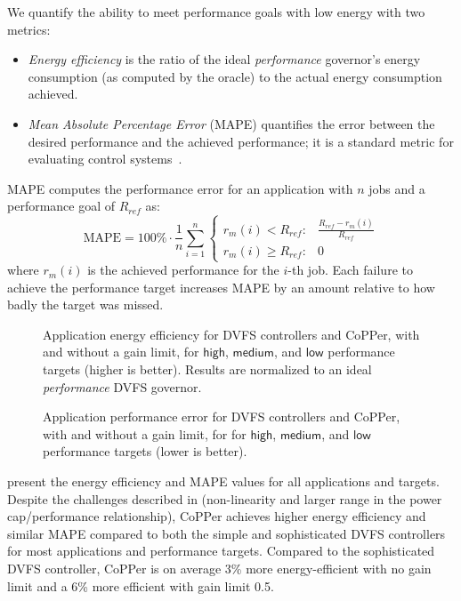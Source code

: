 We quantify the ability to meet performance goals with low energy with two metrics:
\begin{itemize}
\item \emph{Energy efficiency} is the ratio of the ideal \emph{performance} governor's energy consumption (as computed by the oracle) to the actual energy consumption achieved.  
\item \emph{Mean Absolute Percentage Error} (MAPE) quantifies the error between the desired performance and the achieved performance; it is a standard metric for evaluating control systems~\cite{ICSE2014}.  
\end{itemize}
MAPE computes the performance error for an application with $n$ jobs and a performance goal of $R_{ref}$ as:
\begin{equation}
\text{MAPE} = 100\% \cdot \frac{1}{n} \sum\limits_{i=1}^{n}
\left \{
\begin{array}{ll}
r_m(i) < R_{ref}  :& \frac{R_{ref} - r_m(i)}{R_{ref}} \\
r_m(i) \ge R_{ref}  :& 0
\end{array} \right.
\end{equation}
where $r_m(i)$ is the achieved performance for the $i$-th job.
Each failure to achieve the performance target increases MAPE by an amount relative to how badly the target was missed.

\begin{figure}[t]
  \centering
  
  \caption{Application energy efficiency for DVFS controllers and CoPPer, with and without a gain limit, for $\mathsf{high}$, $\mathsf{medium}$, and $\mathsf{low}$ performance targets (higher is better).
  Results are normalized to an ideal \emph{performance} DVFS governor.}
  \label{fig:copper-ee}
\end{figure}

\begin{figure}[t]
  \centering
  
  \caption{Application performance error for DVFS controllers and CoPPer, with and without a gain limit, for for $\mathsf{high}$, $\mathsf{medium}$, and $\mathsf{low}$ performance targets (lower is better).}
  \label{fig:copper-mape}
\end{figure}

 present the energy efficiency and MAPE values for all applications and targets.
Despite the challenges described in  (\eg non-linearity and larger range in the power cap/performance relationship), CoPPer achieves higher energy efficiency and similar MAPE compared to both the simple and sophisticated DVFS controllers for most applications and performance targets.
Compared to the sophisticated DVFS controller, CoPPer is on average 3\% more energy-efficient with no gain limit and a 6\% more efficient with gain limit 0.5.

